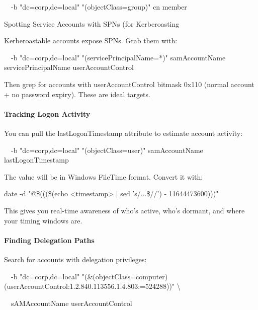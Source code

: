 
  -b "dc=corp,dc=local" "(objectClass=group)" cn member

Spotting Service Accounts with SPNs (for Kerberoasting

Kerberoastable accounts expose SPNs. Grab them with:


  -b "dc=corp,dc=local" "(servicePrincipalName=*)" samAccountName servicePrincipalName userAccountControl

Then grep for accounts with userAccountControl bitmask 0x110 (normal account + no password expiry). These are ideal targets.

\paragraph{\textbf{   Tracking Logon Activity}}

You can pull the lastLogonTimestamp attribute to estimate account activity:


  -b "dc=corp,dc=local" "(objectClass=user)" samAccountName lastLogonTimestamp

The value will be in Windows FileTime format. Convert it with:

date -d "@\$(((\$(echo <timestamp> | sed 's/...\$//') - 11644473600)))"

This gives you real-time awareness of who's active, who's dormant, and where your timing windows are.

\paragraph{\textbf{Finding Delegation Paths}}

Search for accounts with delegation privileges:


  -b "dc=corp,dc=local" "(\&(objectClass=computer)(userAccountControl:1.2.840.113556.1.4.803:=524288))" \textbackslash{}

  sAMAccountName userAccountControl

